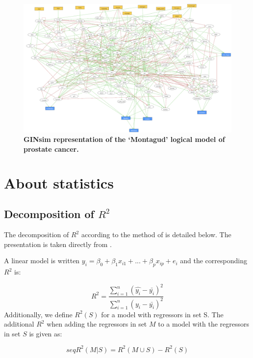\documentclass[a4paper,12pt,twoside,onecolumn,openright,final,oldfontcommands]{memoir}
\begin{document}
\begin{figure}

{\centering \includegraphics[width=0.9\linewidth]{fig/Montagud} 

}

\caption[Graphical abstract of PROFILE method to personalize logical models with omics data]{\textbf{GINsim representation of the `Montagud'
logical model of prostate cancer.}}\label{fig:Montagud}
\end{figure}




\chapter{About statistics}\label{about-statistics}

\section{\texorpdfstring{Decomposition of
\(R^2\)}{Decomposition of R\^{}2}}\label{appendix-decomp}

The decomposition of \(R^2\) according to the method of
\citet{lindeman1980introduction} is detailed below. The presentation is
taken directly from \citet{gromping2006relative}.

A linear model is written
\(y_i=\beta_0+\beta_1x_{i1}+...+\beta_px_{ip}+e_i\) and the
corresponding \(R^2\) is:

\[R^2=\dfrac{\sum_{i=1}^{n} (\hat{y_i}-\bar{y_i})^2}{\sum_{i=1}^{n}  (y_i-\bar{y_i})^2}\]
Additionally, we define \(R^2(S)\) for a model with regressors in set S.
The additional \(R^2\) when adding the regressors in set \(M\) to a
model with the regressors in set \(S\) is given as:

\[seqR^2(M|S)=R^2(M\cup S)-R^2(S)\]
\end{document}
